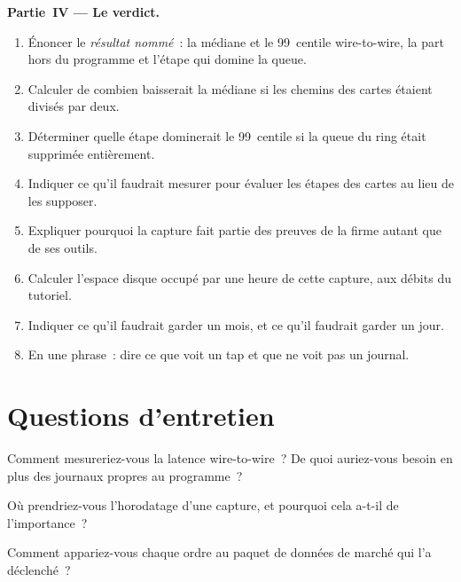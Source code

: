 \begin{problem}
\medskip\noindent\textbf{Partie~IV --- Le verdict.}
\begin{enumerate}[resume]
\item Énoncer le \emph{résultat nommé}~: la médiane et le 99~centile wire-to-wire, la part hors du programme et l'étape qui domine la
  queue.
\item Calculer de combien baisserait la médiane si les chemins des cartes étaient divisés par deux.
\item Déterminer quelle étape dominerait le 99~centile si la queue du ring était supprimée entièrement.
\item Indiquer ce qu'il faudrait mesurer pour évaluer les étapes des cartes au lieu de les supposer.
\item Expliquer pourquoi la capture fait partie des preuves de la firme autant que de ses outils.
\item Calculer l'espace disque occupé par une heure de cette capture, aux débits du tutoriel.
\item Indiquer ce qu'il faudrait garder un mois, et ce qu'il faudrait garder un jour.
\item En une phrase~: dire ce que voit un tap et que ne voit pas un journal.
\end{enumerate}
\end{problem}

\section{Questions d'entretien}

\begin{interviewq}\label{iq:nw:capturing-and-monitoring-the-network:1}
Comment mesureriez-vous la latence wire-to-wire~? De quoi auriez-vous besoin en plus des journaux propres au programme~?
\end{interviewq}

\begin{interviewq}\label{iq:nw:capturing-and-monitoring-the-network:2}
Où prendriez-vous l'horodatage d'une capture, et pourquoi cela a-t-il de l'importance~?
\end{interviewq}

\begin{interviewq}\label{iq:nw:capturing-and-monitoring-the-network:3}
Comment appariez-vous chaque ordre au paquet de données de marché qui l'a déclenché~?
\end{interviewq}

